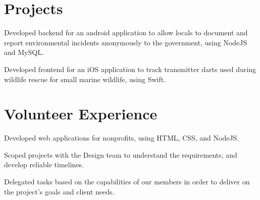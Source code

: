\documentclass[]{deedy-resume-openfont}
\begin{document}
\begin{minipage}[t]{0.66\textwidth}



\section{Projects}
\location

\begin{tightemize}
\item Developed backend for an android application to allow locals to document and report environmental incidents anonymously to the government, using NodeJS and MySQL. 
\end{tightemize}
\sectionsep

\location

\begin{tightemize}
\item Developed frontend for an iOS application to track transmitter darts used during wildlife rescue for small marine wildlife, using Swift.
\end{tightemize}
\sectionsep

\section{Volunteer Experience}

\begin{tightemize}
\item Developed web applications for nonprofits, using HTML, CSS, and NodeJS. 
\item Scoped projects with the Design team  to understand the requirements, and develop reliable timelines.
\item Delegated tasks based on the  capabilities of our members in order to deliver on the project's goals and client needs. 
\end{tightemize}
\sectionsep


\end{minipage}
\end{document}
